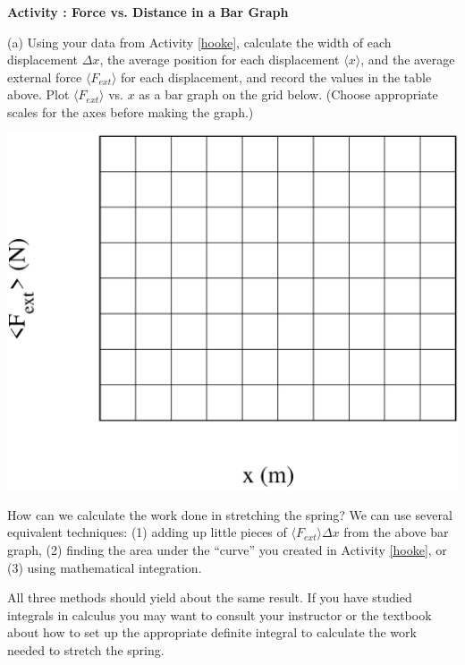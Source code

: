 \textbf{Activity  : Force vs. Distance in a Bar Graph }

(a) Using your data from Activity \ref{hooke}, calculate the width of each displacement \( \Delta x \),
the average position for each displacement $\langle x \rangle$, 
and the average external force \(\langle F_{ext} \rangle\) for each displacement, 
and record the values in the table above. Plot \( \langle F_{ext} \rangle\) vs. $x$ 
as a bar graph on the grid below.  
(Choose appropriate scales for the axes before making the graph.)

\vspace{0.3cm}
{\par\centering \includegraphics[width=6.0in]{workAndKE/workAndKEF2.eps} \par}
\vspace{0.3cm}

How can we calculate the work done in stretching the spring? We can use several
equivalent techniques: (1) adding up little pieces of \( \langle F_{ext} 
\rangle \Delta x \) from the above bar graph,
(2) finding the area under the ``curve'' you created in Activity \ref{hooke}, or (3)
using mathematical integration.

All three methods should yield about the same result. 
If you have studied integrals in calculus you may want to consult
your instructor or the textbook about how to set up the appropriate definite
integral to calculate the work needed to stretch the spring. 

